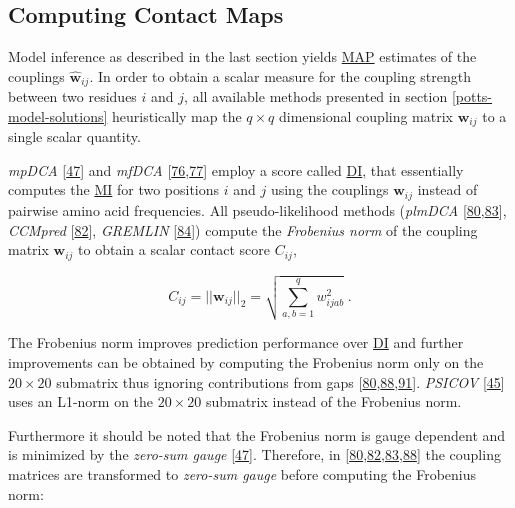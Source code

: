 \documentclass[12pt,a4paper,twoside]{book}
\newcommand{\w}{\mathbf{w}}
\newcommand{\wij}{\mathbf{w}_{ij}}
\newcommand{\wijab}{w_{ijab}}
\theoremstyle{definition}
\theoremstyle{definition}
\theoremstyle{remark}
\begin{document}
\subsection{Computing Contact Maps}\label{post-processing-heuristics}

Model inference as described in the last section yields
\protect\hyperlink{abbrev}{MAP} estimates of the couplings
\(\hat{\w}_{ij}\). In order to obtain a scalar measure for the coupling
strength between two residues \(i\) and \(j\), all available methods
presented in section \ref{potts-model-solutions} heuristically map the
\(q \! \times \! q\) dimensional coupling matrix \(\wij\) to a single
scalar quantity.

\emph{mpDCA} {[}\protect\hyperlink{ref-Weigt2009}{47}{]} and
\emph{mfDCA}
{[}\protect\hyperlink{ref-Morcos2011}{76},\protect\hyperlink{ref-Marks2011}{77}{]}
employ a score called \protect\hyperlink{abbrev}{DI}, that essentially
computes the \protect\hyperlink{abbrev}{MI} for two positions \(i\) and
\(j\) using the couplings \(\wij\) instead of pairwise amino acid
frequencies. All pseudo-likelihood methods (\emph{plmDCA}
{[}\protect\hyperlink{ref-Ekeberg2013}{80},\protect\hyperlink{ref-Ekeberg2014}{83}{]},
\emph{CCMpred} {[}\protect\hyperlink{ref-Seemayer2014}{82}{]},
\emph{GREMLIN} {[}\protect\hyperlink{ref-Kamisetty2013}{84}{]}) compute
the \emph{Frobenius norm} of the coupling matrix \(\wij\) to obtain a
scalar contact score \(C_{ij}\),

\begin{equation}
    C_{ij}  = ||\wij||_2 = \sqrt{\sum_{a,b=1}^q \wijab^2} \; .
\label{eq:frobenius-norm}
\end{equation}

The Frobenius norm improves prediction performance over
\protect\hyperlink{abbrev}{DI} and further improvements can be obtained
by computing the Frobenius norm only on the \(20 \times 20\) submatrix
thus ignoring contributions from gaps
{[}\protect\hyperlink{ref-Ekeberg2013}{80},\protect\hyperlink{ref-Baldassi2014}{88},\protect\hyperlink{ref-Feinauer2014}{91}{]}.
\emph{PSICOV} {[}\protect\hyperlink{ref-Jones2012}{45}{]} uses an
L1-norm on the \(20 \times 20\) submatrix instead of the Frobenius norm.

Furthermore it should be noted that the Frobenius norm is gauge
dependent and is minimized by the \emph{zero-sum gauge}
{[}\protect\hyperlink{ref-Weigt2009}{47}{]}. Therefore, in
{[}\protect\hyperlink{ref-Ekeberg2013}{80},\protect\hyperlink{ref-Seemayer2014}{82},\protect\hyperlink{ref-Ekeberg2014}{83},\protect\hyperlink{ref-Baldassi2014}{88}{]}
the coupling matrices are transformed to \emph{zero-sum gauge} before
computing the Frobenius norm:
\end{document}
